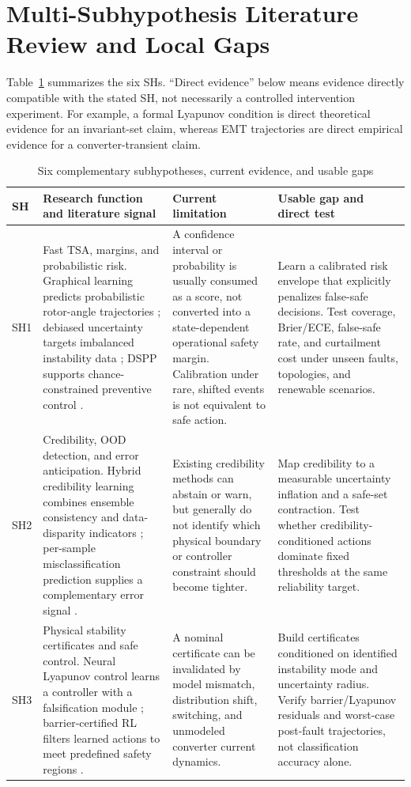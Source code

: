 \documentclass[conference]{IEEEtran}
\begin{document}
\section{Multi-Subhypothesis Literature Review and Local Gaps}

Table~\ref{tab:sh} summarizes the six SHs. ``Direct evidence'' below means evidence directly compatible with the stated SH, not necessarily a controlled intervention experiment. For example, a formal Lyapunov condition is direct theoretical evidence for an invariant-set claim, whereas EMT trajectories are direct empirical evidence for a converter-transient claim.

\begin{table}[t]
\caption{Six complementary subhypotheses, current evidence, and usable gaps}
\label{tab:sh}
\centering
\footnotesize
\setlength{\tabcolsep}{2.5pt}
\begin{tabular}{p{} p{} p{} p{}}
\hline
\textbf{SH} & \textbf{Research function and literature signal} & \textbf{Current limitation} & \textbf{Usable gap and direct test}\\
\hline
SH1 & Fast TSA, margins, and probabilistic risk. Graphical learning predicts probabilistic rotor-angle trajectories \cite{lu2025}; debiased uncertainty targets imbalanced instability data \cite{tan2023}; DSPP supports chance-constrained preventive control \cite{su2024}. & A confidence interval or probability is usually consumed as a score, not converted into a state-dependent operational safety margin. Calibration under rare, shifted events is not equivalent to safe action. & Learn a calibrated risk envelope that explicitly penalizes false-safe decisions. Test coverage, Brier/ECE, false-safe rate, and curtailment cost under unseen faults, topologies, and renewable scenarios.\\
\hline
SH2 & Credibility, OOD detection, and error anticipation. Hybrid credibility learning combines ensemble consistency and data-disparity indicators \cite{li2025}; per-sample misclassification prediction supplies a complementary error signal \cite{bogodorova2024}. & Existing credibility methods can abstain or warn, but generally do not identify which physical boundary or controller constraint should become tighter. & Map credibility to a measurable uncertainty inflation and a safe-set contraction. Test whether credibility-conditioned actions dominate fixed thresholds at the same reliability target.\\
\hline
SH3 & Physical stability certificates and safe control. Neural Lyapunov control learns a controller with a falsification module \cite{zhao2022}; barrier-certified RL filters learned actions to meet predefined safety regions \cite{zhao2023}. & A nominal certificate can be invalidated by model mismatch, distribution shift, switching, and unmodeled converter current dynamics. & Build certificates conditioned on identified instability mode and uncertainty radius. Verify barrier/Lyapunov residuals and worst-case post-fault trajectories, not classification accuracy alone.\\

\end{tabular}
\end{table}
\end{document}
